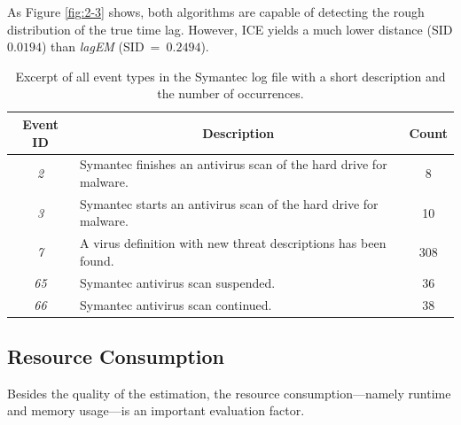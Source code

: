 \documentclass[conference]{IEEEtran}
\theoremstyle{examplestyle}
\begin{document}
As Figure \ref{fig:2-3} shows, both algorithms are capable of detecting the rough distribution of the true time lag. However, \ac{ICE} yields a much lower distance (\ac{SID} $0.0194$) than \textit{lagEM} (\ac{SID}~=~$0.2494$).


\begin{table}[!ht]
	\caption{Excerpt of all event types in the Symantec log file with a short description and the number of occurrences.}
	\label{tbl:symantecEvents}

	\centering
	\begin{tabular}{c p{} c}
		\textbf{Event ID} & \multicolumn{1}{c}{\textbf{Description}} & \textbf{Count} \\
		\hline
		\textit{2}	& Symantec finishes an antivirus scan of the hard drive for malware. & 8 \\
		\textit{3}	& Symantec starts an antivirus scan of the hard drive for malware. & 10 \\
		\textit{7}	& A virus definition with new threat descriptions has been found. & 308 \\
		\textit{65}	& Symantec antivirus scan suspended. & 36 \\
		\textit{66}	& Symantec antivirus scan continued. & 38 \\
	\end{tabular}

\end{table}


\subsection{Resource Consumption}
Besides the quality of the estimation, the resource consumption---namely runtime and memory usage---is an important evaluation factor. 
\end{document}
